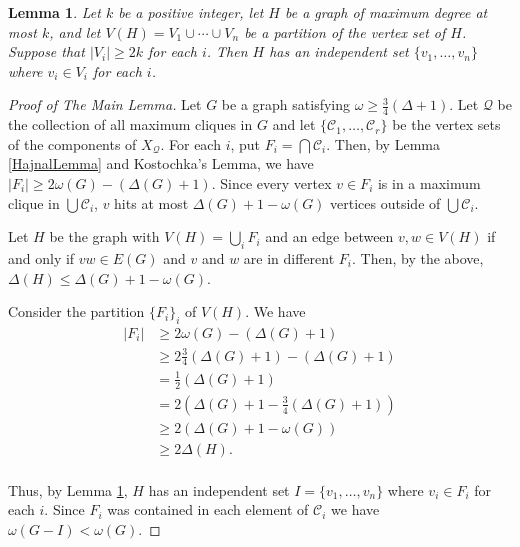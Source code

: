 \documentclass[12pt]{article}
\theoremstyle{plain}
\newtheorem{lem}[thm]{Lemma}
\theoremstyle{definition}
\theoremstyle{remark}
\begin{document}
\begin{lem}\label{HaxellLemma}
Let $k$ be a positive integer, let $H$ be a graph of maximum degree at most $k$,
and let $V(H) = V_1 \cup \cdots \cup V_n$ be a partition of the vertex set of $H$. Suppose that $|V_i| \geq 2k$ for each $i$. Then $H$ has an independent set $\{v_1, \ldots, v_n\}$ where $v_i \in V_i$ for each $i$.
\end{lem}

\begin{proof}[Proof of The Main Lemma]
Let $G$ be a graph satisfying $\omega \geq \frac{3}{4}(\Delta + 1)$. Let $\mathcal{Q}$ be the collection of all maximum cliques in $G$ and let $\{\mathcal{C}_1, \ldots, \mathcal{C}_r\}$ be the vertex sets of the components of $X_{\mathcal{Q}}$. For each $i$, put $F_i = \bigcap \mathcal{C}_i$. Then, by Lemma \ref{HajnalLemma} and Kostochka's Lemma, we have $|F_i| \geq 2\omega(G) - (\Delta(G) + 1)$.  Since every vertex $v \in F_i$ is in a maximum clique in $\bigcup \mathcal{C}_i$, $v$ hits at most $\Delta(G) + 1 - \omega(G)$ vertices outside of $\bigcup \mathcal{C}_i$.\newline

Let $H$ be the graph with $V(H) = \displaystyle \bigcup_{i} F_i$ and an edge between $v, w \in V(H)$ if and only if $vw \in E(G)$ and $v$ and $w$ are in different $F_i$.  Then, by the above, $\Delta(H) \leq \Delta(G) + 1 - \omega(G)$.\newline

Consider the partition $\{F_i\}_{i}$ of $V(H)$.  We have 
\begin{align*}
|F_i| &\geq 2\omega(G) - (\Delta(G) + 1) \\
&\geq 2 \frac{3}{4}(\Delta(G) + 1) - (\Delta(G) + 1) \\
&= \frac{1}{2}(\Delta(G) + 1) \\
&= 2(\Delta(G) + 1 - \frac{3}{4}(\Delta(G) + 1)) \\
&\geq 2(\Delta(G) + 1 - \omega(G)) \\
&\geq 2\Delta(H). \\
\end{align*}

Thus, by Lemma \ref{HaxellLemma}, $H$ has an independent set $I = \{v_1, \ldots, v_n\}$ where $v_i \in F_i$ for each $i$.  Since $F_i$ was contained in each element of $\mathcal{C}_i$ we have $\omega(G - I) < \omega(G)$.
\end{proof}
\end{document}
